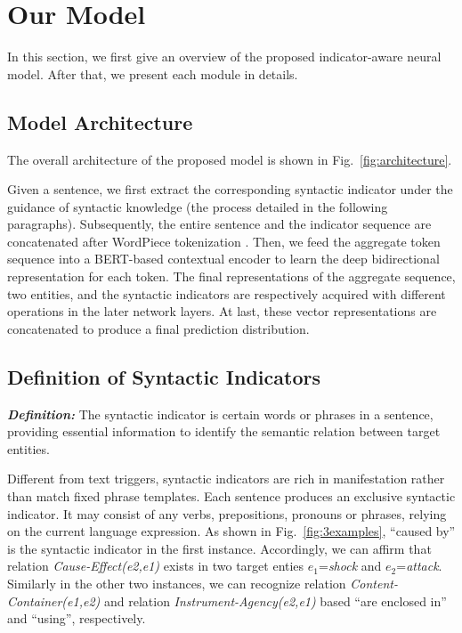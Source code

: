 \documentclass[conference]{IEEEtran}
\begin{document}
\section{Our Model}

In this section, we first give an overview of the proposed indicator-aware neural model. After that, we present each module in details.

\subsection{Model Architecture}

The overall architecture of the proposed model is shown in Fig.~\ref{fig:architecture}. 

Given a sentence, we first extract the corresponding syntactic indicator under the guidance of syntactic knowledge (the process detailed in the following paragraphs). Subsequently, the entire sentence and the indicator sequence are concatenated after WordPiece tokenization \cite{sennrich2016neural}. Then, we feed the aggregate token sequence into a BERT-based contextual encoder to learn the deep bidirectional representation for each token. The final representations of the aggregate sequence, two entities, and the syntactic indicators are respectively acquired with different operations in the later network layers. At last, these vector representations are concatenated to produce a final prediction distribution.

\subsection{Definition of Syntactic Indicators}

{\bf \em Definition: }The syntactic indicator is certain words or phrases in a sentence, providing essential information to identify the semantic relation between target entities. 

Different from text triggers, syntactic indicators are rich in manifestation rather than match fixed phrase templates. Each sentence produces an exclusive syntactic indicator. It may consist of any verbs, prepositions, pronouns or phrases, relying on the current language expression. As shown in Fig.~\ref{fig:3examples}, “caused by” is the syntactic indicator in the first instance. Accordingly, we can affirm that relation {\em Cause-Effect(e2,e1)} exists in two target enties \begin{math}e_1\end{math}={\em shock} and \begin{math}e_2\end{math}={\em attack}. Similarly in the other two instances, we can recognize relation {\em Content-Container(e1,e2)} and relation {\em Instrument-Agency(e2,e1)} based “are enclosed in” and “using”, respectively.
\end{document}
